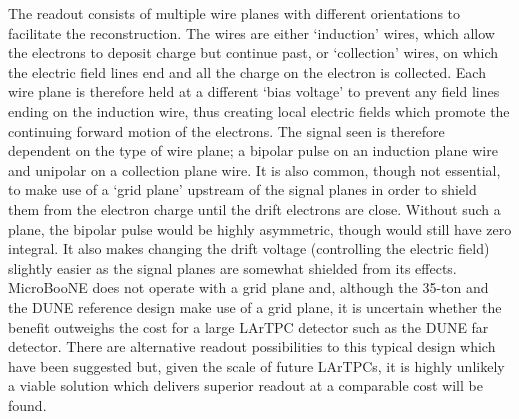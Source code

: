 The readout consists of multiple wire planes with different orientations to facilitate the reconstruction.  The wires are either `induction' wires, which allow the electrons to deposit charge but continue past, or `collection' wires, on which the electric field lines end and all the charge on the electron is collected.  Each wire plane is therefore held at a different `bias voltage' to prevent any field lines ending on the induction wire, thus creating local electric fields which promote the continuing forward motion of the electrons.  The signal seen is therefore dependent on the type of wire plane; a bipolar pulse on an induction plane wire and unipolar on a collection plane wire.  It is also common, though not essential, to make use of a `grid plane' upstream of the signal planes in order to shield them from the electron charge until the drift electrons are close.  Without such a plane, the bipolar pulse would be highly asymmetric, though would still have zero integral.  It also makes changing the drift voltage (controlling the electric field) slightly easier as the signal planes are somewhat shielded from its effects.  MicroBooNE does not operate with a grid plane and, although the 35-ton and the DUNE reference design make use of a grid plane, it is uncertain whether the benefit outweighs the cost for a large LArTPC detector such as the DUNE far detector.  There are alternative readout possibilities to this typical design which have been suggested but, given the scale of future LArTPCs, it is highly unlikely a viable solution which delivers superior readout at a comparable cost will be found.

